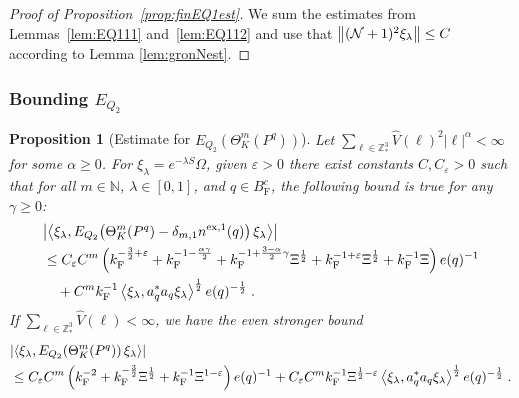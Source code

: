 \documentclass[12pt,a4paper]{article}
\numberwithin{equation}{section}
\newcommand{\NNN}{\mathbb{N}}
\newcommand{\1}{\mathbb{I}}
\newcommand{\ex}{\mathrm{ex}}
\newcommand{\F}{\mathrm{F}}
\newcommand{\Z}{\mathbb{Z}}
\newcommand{\NN}{\mathcal{N}}
\newcommand{\half}{\frac{1}{2}}
\newcommand{\eva}[1]{\left\langle #1 \right\rangle}
\theoremstyle{plain}
\newtheorem{proposition}[theorem]{Proposition}
\theoremstyle{definition}
\theoremstyle{remark}
\theoremstyle{plain}
\theoremstyle{definition}
\theoremstyle{remark}
\begin{document}
\begin{proof}[Proof of Proposition~\ref{prop:finEQ1est}]
We sum the estimates from Lemmas~\ref{lem:EQ111} and~\ref{lem:EQ112} and use that $ \norm{(\NN+1)^2 \xi_\lambda} \le C $ according to Lemma \ref{lem:gronNest}.
\end{proof}






\subsubsection{Bounding $E_{Q_2}$}


\begin{proposition}[Estimate for $E_{Q_2}(\Theta^m_{K}(P^q))$]\label{prop:finEQ2est}
Let $ \sum_{\ell \in \Z^3_*} \hat{V}(\ell)^2 |\ell|^\alpha < \infty $ for some $ \alpha \ge 0 $. For $\xi_\lambda = e^{-\lambda S} \Omega$, given $ \varepsilon > 0 $ there exist constants $ C, C_\varepsilon > 0 $ such that for all $ m \in \NNN $, $ \lambda \in [0,1] $, and $ q \in B_{\F}^c $, the following bound is true for any $ \gamma \ge 0 $:
\begin{align}\label{eq:finEQ2est_Coulomb}
	&\abs{\eva{\xi_\lambda, E_{Q_2}\!\left(\Theta^m_K(P^q)- \delta_{m,1} n^{\ex,1}(q) \right) \xi_\lambda}} \nonumber\\
	&\leq C_\varepsilon C^m \left( k_{\F}^{-\frac 32 + \varepsilon} 
		+ k_{\F}^{-1 - \frac{\alpha \gamma}{2}} 
		+ k_{\F}^{-1+ \frac{3-\alpha}{2} \gamma} \Xi^\half
		+ k_{\F}^{-1+\varepsilon} \Xi^\half
		+ k_{\F}^{-1} \Xi \right) e(q)^{-1} \nonumber\\
	&\quad + C^m k_{\F}^{-1} \eva{\xi_\lambda, a_q^* a_q \xi_\lambda}^{\half} e(q)^{-\half}  \;.
\end{align}
If $ \sum_{\ell \in \Z^3_*} \hat{V}(\ell) < \infty $, we have the even stronger bound
\begin{align}\label{eq:finEQ2est}
	&\abs{\eva{\xi_\lambda, E_{Q_2}\!\left(\Theta^m_K(P^q)\right) \xi_\lambda}} \nonumber\\
	&\leq C_\varepsilon C^m \left( k_{\F}^{-2}
		+ k_{\F}^{-\frac{3}{2}} \Xi^\half
		+ k_{\F}^{-1} \Xi^{1-\varepsilon} \right) e(q)^{-1} 
		+ C_\varepsilon C^m k_{\F}^{-1} \Xi^{\half - \varepsilon} \eva{\xi_\lambda, a_q^* a_q \xi_\lambda}^{\half} e(q)^{-\half} \;. \\
\end{align}
\end{proposition}
\end{document}
